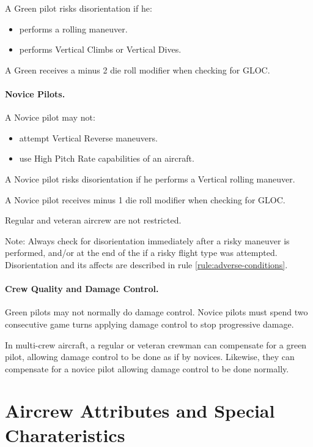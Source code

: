 \begin{advancedrules}
A Green pilot risks disorientation if he:
\begin{itemize}
    \item performs a rolling maneuver.
    \item performs Vertical Climbs or Vertical Dives.
\end{itemize}

A Green  receives a minus 2 die roll modifier when checking for GLOC.

\paragraph{Novice Pilots.} A Novice pilot may not:

\begin{itemize}
    \item attempt Vertical Reverse maneuvers.
    \item use High Pitch Rate capabilities of an aircraft.
\end{itemize}

A Novice pilot risks disorientation if he performs a Vertical rolling maneuver.

A Novice pilot receives minus 1 die roll modifier when checking for GLOC.

Regular and veteran aircrew are not restricted.

Note: Always check for disorientation immediately after a risky maneuver is performed, and/or at the end of the  if a risky flight type was attempted. Disorientation and its affects are described in rule \ref{rule:adverse-conditions}.

\paragraph{Crew Quality and Damage Control.} Green pilots may not normally do damage control. Novice pilots must spend two consecutive game turns applying damage control to stop progressive damage.

In multi-crew aircraft, a regular or veteran crewman can compensate for a green pilot, allowing damage control to be done as if by novices. Likewise, they can compensate for a novice pilot allowing damage control to be done normally.

\section{Aircrew Attributes and Special Charateristics}
\label{rule:crew-attributes}
\label{rule:crew-characteristics}


\end{advancedrules}
